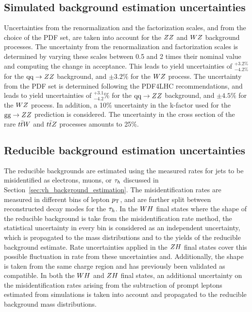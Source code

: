 \subsection{Simulated background estimation uncertainties}
Uncertainties from the renormalization and the factorization scales, and from the 
choice of the PDF set, are taken into account for the $ZZ$ and $WZ$ 
background processes. The uncertainty from the renormalization and factorization 
scales is determined by varying these scales between 0.5 and 2 times their nominal 
value and computing the change in acceptance. This leads to yield uncertainties 
of $^{+3.2\%}_{-4.2\%}$ for the $\text{q}\text{q}\rightarrow ZZ$ background, and $\pm 3.2\%$ 
for the $WZ$ process. The uncertainty from the PDF set is determined following 
the PDF4LHC recommendations, and leads to yield uncertainties of $^{+3.1}_{-4.2}\%$ for 
the $\text{q}\text{q}\rightarrow ZZ$ background, and $\pm 4.5\%$ for the $WZ$ process. 
In addition, a 10\% uncertainty in the k-factor used for the $\text{g}\text{g} \rightarrow 
ZZ$ prediction is considered. The uncertainty in the cross section of the 
rare $t\bar{t}W$ and $t\bar{t}Z$ processes amounts to 25\%.

\subsection{Reducible background estimation uncertainties}
The reducible backgrounds are estimated using the measured rates for jets to be 
misidentified as electrons, muons, or $\tau_{h}$ discussed in 
Section~\ref{sec:vh_background_estimation}. The misidentification rates are 
measured in different bins of lepton $p_\mathrm{T}$, and are further split between 
reconstructed decay modes for the $\tau_{h}$. In the $WH$ final states where
the shape of the reducible background is take from the misidentification rate
method, the statistical uncertainty in every 
bin is considered as an independent uncertainty, which is propagated to the mass 
distributions and to the yields of the reducible background estimate. Rate
uncertainties applied in the $ZH$ final states cover this possible fluctuation
in rate from these uncertainties and. Additionally, the shape is taken from the same charge
region and has previously been validated as compatible.
In both the $WH$ and $ZH$ final states, an additional
uncertainty on the misidentification rates arising from the subtraction of 
prompt leptons estimated from simulations is taken into account and propagated to 
the reducible background mass distributions. 

